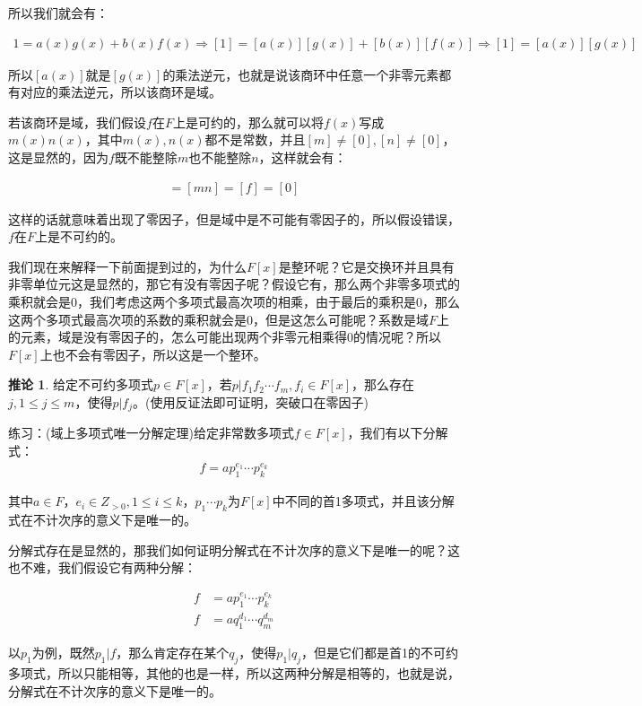 \documentclass[12pt, a4paper, oneside]{ctexart}
\theoremstyle{definition}
\newtheorem*{corollary}{推论}
\begin{document}
所以我们就会有：

\begin{align*}
1=a(x)g(x)+b(x)f(x)\Rightarrow [1]=[a(x)][g(x)]+[b(x)][f(x)]\Rightarrow [1]=[a(x)][g(x)]
\end{align*}

所以$[a(x)]$就是$[g(x)]$的乘法逆元，也就是说该商环中任意一个非零元素都有对应的乘法逆元，所以该商环是域。

若该商环是域，我们假设$f$在$F$上是可约的，那么就可以将$f(x)$写成$m(x)n(x)$，其中$m(x),n(x)$都不是常数，并且$[m]\neq [0],[n]\neq [0]$，这是显然的，因为$f$既不能整除$m$也不能整除$n$，这样就会有：

\begin{align*}
[m][n]=[mn]=[f]=[0]
\end{align*}

这样的话就意味着出现了零因子，但是域中是不可能有零因子的，所以假设错误，$f$在$F$上是不可约的。

我们现在来解释一下前面提到过的，为什么$F[x]$是整环呢？它是交换环并且具有非零单位元这是显然的，那它有没有零因子呢？假设它有，那么两个非零多项式的乘积就会是0，我们考虑这两个多项式最高次项的相乘，由于最后的乘积是0，那么这两个多项式最高次项的系数的乘积就会是0，但是这怎么可能呢？系数是域$F$上的元素，域是没有零因子的，怎么可能出现两个非零元相乘得0的情况呢？所以$F[x]$上也不会有零因子，所以这是一个整环。

\begin{corollary}
给定不可约多项式$p\in F[x]$，若$p|f_1f_2\cdots f_m,f_i\in F[x]$，那么存在$j,1\leqslant j\leqslant m$，使得$p|f_j$。(使用反证法即可证明，突破口在零因子)
\end{corollary}

练习：(域上多项式唯一分解定理)给定非常数多项式$f\in F[x]$，我们有以下分解式：
\begin{align*}
f=ap_1^{e_1}\cdots p_k^{e_k}
\end{align*}

其中$a\in F$，$e_i\in Z_{>0},1\leqslant i\leqslant k$，$p_1\cdots p_k$为$F[x]$中不同的首1多项式，并且该分解式在不计次序的意义下是唯一的。

分解式存在是显然的，那我们如何证明分解式在不计次序的意义下是唯一的呢？这也不难，我们假设它有两种分解：

\begin{align*}
f&=ap_1^{e_1}\cdots p_k^{e_k}\\
f&=aq_1^{d_1}\cdots q_m^{d_m}
\end{align*}

以$p_1$为例，既然$p_1|f$，那么肯定存在某个$q_j$，使得$p_1|q_j$，但是它们都是首1的不可约多项式，所以只能相等，其他的也是一样，所以这两种分解是相等的，也就是说，分解式在不计次序的意义下是唯一的。
\end{document}
